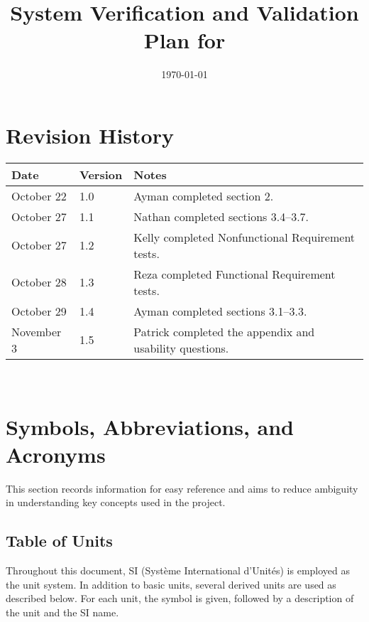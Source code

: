 \documentclass[12pt, titlepage]{article}
\begin{document}
\title{System Verification and Validation Plan for \progname{}} 
\author{\authname}
\date{\today}
	
\maketitle


\section*{Revision History}

\begin{tabularx}{\textwidth}{p{3cm}p{2cm}X}
\toprule
{\bf Date} & {\bf Version} & {\bf Notes} \\
\midrule
October 22 & 1.0 & Ayman completed section 2. \\
October 27 & 1.1 & Nathan completed sections 3.4–3.7. \\
October 27 & 1.2 & Kelly completed Nonfunctional Requirement tests. \\
October 28 & 1.3 & Reza completed Functional Requirement tests. \\
October 29 & 1.4 & Ayman completed sections 3.1–3.3. \\
November 3 & 1.5 & Patrick completed the appendix and usability questions. \\
\bottomrule
\end{tabularx}


~\\

\newpage

\tableofcontents

\listoftables

\newpage

\section{Symbols, Abbreviations, and Acronyms}
This section records information for easy reference and aims to reduce ambiguity in understanding key concepts used in the project.

\subsection{Table of Units}

Throughout this document, SI (Système International d'Unités) is employed as the unit system. In addition to basic units, several derived units are used as described below. For each unit, the symbol is given, followed by a description of the unit and the SI name.
\end{document}
